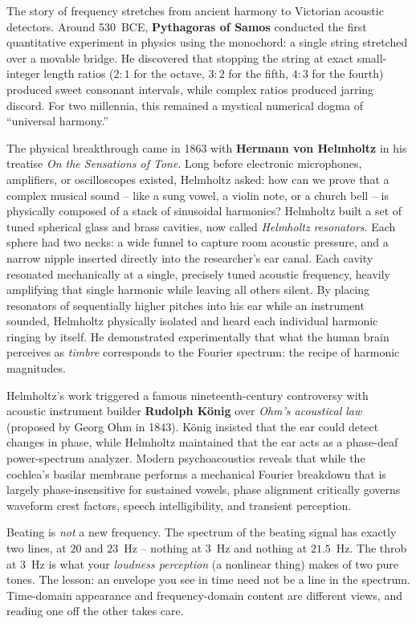 \begin{historybox}
The story of frequency stretches from ancient harmony to Victorian acoustic
detectors. Around 530~BCE, \textbf{Pythagoras of Samos} conducted the first quantitative
experiment in physics using the monochord: a single string stretched over a movable bridge.
He discovered that stopping the string at exact small-integer length ratios ($2:1$ for the octave,
$3:2$ for the fifth, $4:3$ for the fourth) produced sweet consonant intervals, while complex ratios
produced jarring discord. For two millennia, this remained a mystical numerical dogma of
``universal harmony.''

The physical breakthrough came in 1863 with \textbf{Hermann von Helmholtz} in his treatise
\emph{On the Sensations of Tone}. Long before electronic microphones, amplifiers, or oscilloscopes
existed, Helmholtz asked: how can we prove that a complex musical sound -- like
a sung vowel, a violin note, or a church bell -- is physically composed of a stack of sinusoidal
harmonics? Helmholtz built a set of tuned spherical glass and brass cavities, now called
\emph{Helmholtz resonators}. Each sphere had two necks: a wide funnel to capture room acoustic
pressure, and a narrow nipple inserted directly into the researcher's ear canal. Each cavity
resonated mechanically at a single, precisely tuned acoustic frequency, heavily amplifying that
single harmonic while leaving all others silent. By placing resonators of sequentially higher
pitches into his ear while an instrument sounded, Helmholtz physically isolated and heard each
individual harmonic ringing by itself. He demonstrated experimentally that what the human brain
perceives as \emph{timbre} corresponds to the Fourier spectrum: the recipe of harmonic
magnitudes.

Helmholtz's work triggered a famous nineteenth-century controversy with acoustic instrument builder
\textbf{Rudolph K\"{o}nig} over \emph{Ohm's acoustical law} (proposed by Georg Ohm in 1843).
K\"{o}nig insisted that the ear could detect changes in phase, while Helmholtz maintained that the
ear acts as a phase-deaf power-spectrum analyzer. Modern psychoacoustics reveals that while the
cochlea's basilar membrane performs a mechanical Fourier breakdown that is largely phase-insensitive
for sustained vowels, phase alignment critically governs waveform crest factors, speech intelligibility,
and transient perception.
\end{historybox}

\begin{trapbox}
Beating is \emph{not} a new frequency. The spectrum of the beating signal has exactly
two lines, at $20$ and $23$~Hz -- nothing at $3$~Hz and nothing at $21.5$~Hz. The
throb at $3$~Hz is what your \emph{loudness perception} (a nonlinear thing) makes of
two pure tones. The lesson: an envelope you see in time need not be a line in the
spectrum. Time-domain appearance and frequency-domain content are different views,
and reading one off the other takes care.
\end{trapbox}

